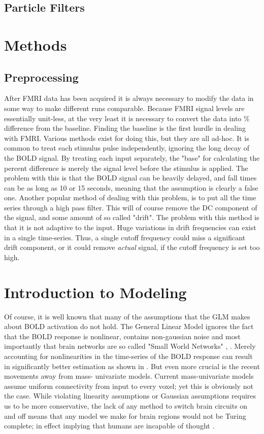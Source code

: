 \documentclass{article}
\begin{document}
\subsection{Particle Filters}

\section*{Methods}
\subsection*{Preprocessing}
After FMRI data has been acquired it is always necessary to modify the
data in some way to make different runs comparable. Because FMRI signal
levels are essentially unit-less, at the very least it is necessary to convert
the data into \% difference from the baseline. Finding the baseline is the
first hurdle in dealing with FMRI. Various methods exist for doing this,
but they are all ad-hoc. It is common to treat each stimulus pulse independently,
ignoring the long decay of the BOLD signal. By treating each input separately,
the "base" for calculating the percent difference is merely the signal level 
before the stimulus is applied. The problem with this is that the BOLD signal
can be heavily delayed, and fall times can be as long as 10 or 15 seconds,
meaning that the assumption is clearly a false one. Another popular method 
of dealing with this problem, is to put all the time series through a high
pass filter. This will of course remove the DC component of the signal, and 
some amount of so called "drift". The problem with this method is that it is
not adaptive to the input. Huge variations in drift frequencies can exist 
in a single time-series. Thus, a single cutoff frequency could miss a significant
drift component, or it could remove \emph{actual} signal, if the cutoff frequency is
set too high. 


\section*{Introduction to Modeling}

Of course, it is well known that many of the assumptions 
that the GLM makes about BOLD activation do not hold. 
The General Linear Model ignores
the fact that the BOLD response is nonlinear, contains non-gaussian
noise and most importantly that brain networks are 
so called "Small World Networks" \cite{smallworld}, \cite{noise}. 
Merely accounting for
nonlinearities in the time-series of the BOLD response can
result in significantly better estimation as shown in \cite{nonlinearmodels}.
But even more crucial is the recent movements away from mass-
univariate models. Current mass-univariate models 
assume uniform connectivity from input to every voxel; yet
this is obviously not the case. While
violating linearity assumptions or Gaussian assumptions 
requires us to be more conservative, the lack of any method
to switch brain circuits on and off means that any model
we make for brain regions would not be Turing complete;
in effect implying that humans are incapable of 
thought \cite{turing}.
\end{document}

